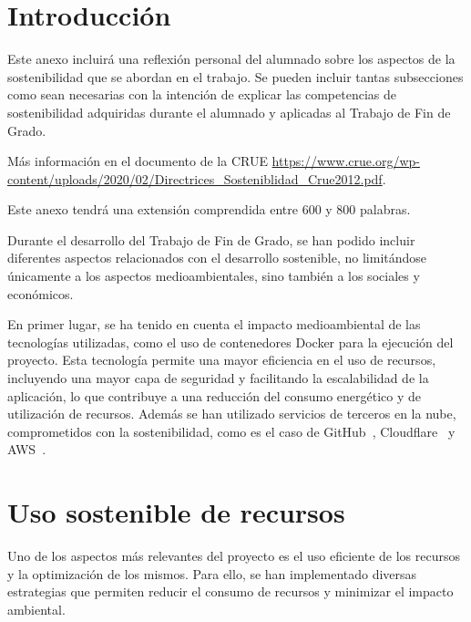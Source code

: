 
\section{Introducción}
Este anexo incluirá una reflexión personal del alumnado sobre los aspectos de la sostenibilidad que se abordan en el trabajo.
Se pueden incluir tantas subsecciones como sean necesarias con la intención de explicar las competencias de sostenibilidad adquiridas durante el alumnado y aplicadas al Trabajo de Fin de Grado.

Más información en el documento de la CRUE \url{https://www.crue.org/wp-content/uploads/2020/02/Directrices_Sosteniblidad_Crue2012.pdf}.

Este anexo tendrá una extensión comprendida entre 600 y 800 palabras.




Durante el desarrollo del Trabajo de Fin de Grado, se han podido incluir diferentes aspectos relacionados con el desarrollo sostenible, no limitándose únicamente a los aspectos medioambientales, sino también a los sociales y económicos.

En primer lugar, se ha tenido en cuenta el impacto medioambiental de las tecnologías utilizadas, como el uso de contenedores Docker para la ejecución del proyecto. Esta tecnología permite una mayor eficiencia en el uso de recursos, incluyendo una mayor capa de seguridad y facilitando la escalabilidad de la aplicación, lo que contribuye a una reducción del consumo energético y de utilización de recursos.
Además se han utilizado servicios de terceros en la nube, comprometidos con la sostenibilidad, como es el caso de GitHub~\cite{SosGithub}, Cloudflare~\cite{SosCloudflare} y AWS~\cite{SosAWS}.

\section{Uso sostenible de recursos}

Uno de los aspectos más relevantes del proyecto es el uso eficiente de los recursos y la optimización de los mismos. Para ello, se han implementado diversas estrategias que permiten reducir el consumo de recursos y minimizar el impacto ambiental.

